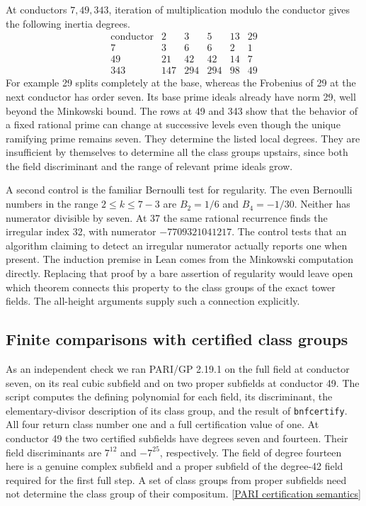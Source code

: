\documentclass[12pt,letterpaper]{article}
\begin{document}
At conductors \(7,49,343\), iteration of multiplication modulo the conductor gives the following inertia degrees.
\[
\begin{array}{c|rrrrr}
\text{conductor}&2&3&5&13&29\\ \hline
7&3&6&6&2&1\\
49&21&42&42&14&7\\
343&147&294&294&98&49
\end{array}
\]
For example 29 splits completely at the base, whereas the Frobenius of 29 at the next conductor has order seven. Its base prime ideals already have norm 29, well beyond the Minkowski bound. The rows at 49 and 343 show that the behavior of a fixed rational prime can change at successive levels even though the unique ramifying prime remains seven. They determine the listed local degrees. They are insufficient by themselves to determine all the class groups upstairs, since both the field discriminant and the range of relevant prime ideals grow.

A second control is the familiar Bernoulli test for regularity. The even Bernoulli numbers in the range \(2\le k\le7-3\) are \(B_2=1/6\) and \(B_4=-1/30\). Neither has numerator divisible by seven. At 37 the same rational recurrence finds the irregular index 32, with numerator \(-7709321041217\). The control tests that an algorithm claiming to detect an irregular numerator actually reports one when present. The induction premise in Lean comes from the Minkowski computation directly. Replacing that proof by a bare assertion of regularity would leave open which theorem connects this property to the class groups of the exact tower fields. The all-height arguments supply such a connection explicitly.

\subsection{Finite comparisons with certified class groups}

As an independent check we ran PARI/GP 2.19.1 on the full field at conductor seven, on its real cubic subfield and on two proper subfields at conductor 49. The script computes the defining polynomial for each field, its discriminant, the elementary-divisor description of its class group, and the result of \texttt{bnfcertify}. All four return class number one and a full certification value of one. At conductor 49 the two certified subfields have degrees seven and fourteen. Their field discriminants are \(7^{12}\) and \(-7^{25}\), respectively. The field of degree fourteen here is a genuine complex subfield and a proper subfield of the degree-42 field required for the first full step. A set of class groups from proper subfields need not determine the class group of their compositum. \href{https://pari.math.u-bordeaux.fr/dochtml/html-stable/General_number_fields.html#bnfcertify}{[PARI certification semantics]}
\end{document}
